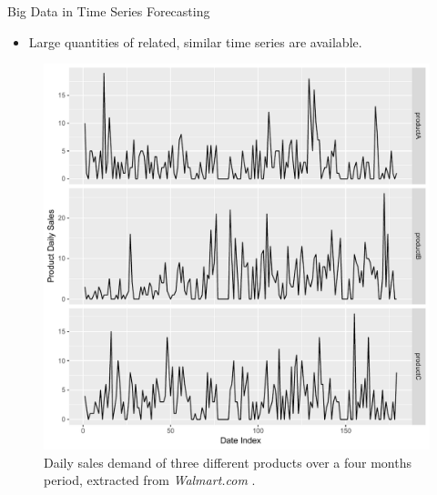 \documentclass{beamer}
\begin{document}
\begin{frame}{Big Data in Time Series Forecasting}
\begin{itemize}
\item Large quantities of related, similar time series are available.
\end{itemize}
 \begin{figure}
   \includegraphics[scale=0.30]{images/walmart}
   \caption{\tiny {Daily sales demand of three different products over a four months period, extracted from \textit{Walmart.com} \cite{Bandara2019-bg}.}}
  \end{figure}
\end{frame}
  
\end{document}
